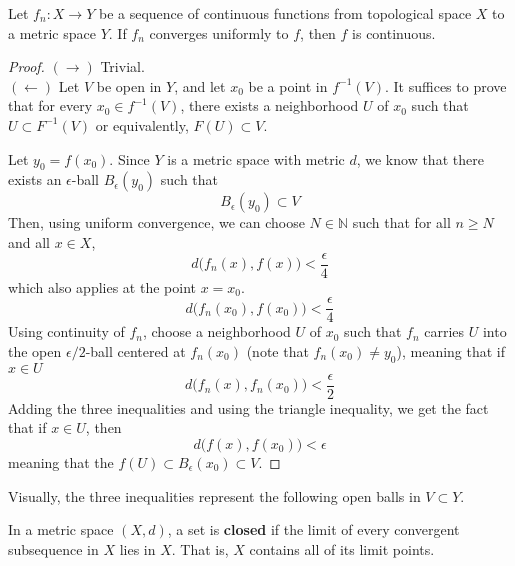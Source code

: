   \begin{theorem}
  Let $f_n: X \longrightarrow Y$ be a sequence of continuous functions from topological space $X$ to a metric space $Y$. If $f_n$ converges uniformly to $f$, then $f$ is continuous. 
  \end{theorem}
  \begin{proof}
  $(\rightarrow)$ Trivial. \\
  $(\leftarrow)$ Let $V$ be open in $Y$, and let $x_0$ be a point in $f^{-1} (V)$. It suffices to prove that for every $x_0 \in f^{-1} (V)$, there exists a neighborhood $U$ of $x_0$ such that $U \subset F^{-1} (V)$ or equivalently, $F(U) \subset V$. 

  Let $y_0 = f(x_0)$. Since $Y$ is a metric space with metric $d$, we know that there exists an $\epsilon$-ball $B_\epsilon (y_0)$ such that
  \[B_\epsilon (y_0) \subset V\]
  Then, using uniform convergence, we can choose $N \in \mathbb{N}$ such that for all $n \geq N$ and all $x \in X$, 
  \[d \big( f_n (x), f(x) \big) < \frac{\epsilon}{4}\]
  which also applies at the point $x = x_0$. 
  \[d \big( f_n (x_0), f(x_0) \big) < \frac{\epsilon}{4}\]
  Using continuity of $f_n$, choose a neighborhood $U$ of $x_0$ such that $f_n$ carries $U$ into the open $\epsilon/2$-ball centered at $f_n (x_0)$ (note that $f_n (x_0) \neq y_0$), meaning that if $x \in U$
  \[d \big( f_n (x), f_n (x_0) \big) < \frac{\epsilon}{2}\]
  Adding the three inequalities and using the triangle inequality, we get the fact that if $x \in U$, then 
  \[d \big( f(x), f(x_0) \big) < \epsilon\]
  meaning that the $f(U) \subset B_\epsilon (x_0) \subset V$. 
  \end{proof}

  Visually, the three inequalities represent the following open balls in $V \subset Y$.
  \begin{center}
  \end{center}

  \begin{proposition}
  In a metric space $(X, d)$, a set is \textbf{closed} if the limit of every convergent subsequence in $X$ lies in $X$. That is, $X$ contains all of its limit points. 
  \end{proposition}

